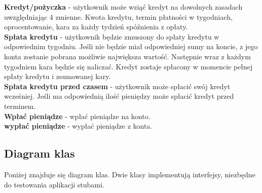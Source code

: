 \documentclass[8pt]{article}
\begin{document}
\textbf{Kredyt/pożyczka} - użytkownik może wziąć kredyt na dowolnych zasadach uwzględniając 4 zmienne. Kwota kredytu, termin płatności w tygodniach, oprocentowanie, kara za każdy tydzień spóźnienia z opłaty.\\

\textbf{Spłata kredytu} - użytkownik będzie zmuszony do spłaty kredytu w odpowiednim tygodniu. Jeśli nie będzie miał odpowiedniej sumy na koncie, z jego konta zostanie pobrana możliwie największa wartość. Następnie wraz z każdym tygodniem kara będzie się naliczać. Kredyt zostaje spłacony w momencie pełnej spłaty kredytu i zsumowanej kary.\\

\textbf{Spłata kredytu przed czasem} - użytkownik może spłacić swój kredyt wcześniej. Jeśli ma odpowiednią ilość pieniędzy może spłacić kredyt przed terminem.\\

\textbf{Wpłać pieniądze} - wpłać pieniądze na konto.\\

\textbf{wypłać pieniądze} - wypłać pieniądze z konta.\\

\subsection*{ Diagram klas}
Poniżej znajduje się diagram klas. Dwie klasy implementują interfejsy, niezbędne do testowania aplikacji stubami.
\begin{center}
\end{center}
\end{document}
